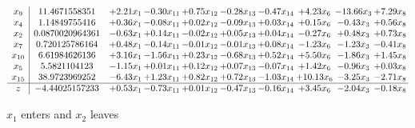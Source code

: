 \documentclass[9pt]{article}
\begin{document}
 \[\begin{array}{c| c c@{\hskip 2pt} c@{\hskip 2pt} c@{\hskip 2pt} c@{\hskip 2pt} c@{\hskip 2pt} c@{\hskip 2pt} c@{\hskip 2pt} c@{\hskip 2pt} }
 x_{9}   &  11.4671558351 & +  2.21 x_{1} & -0.30 x_{11} & +  0.75 x_{12} & -0.28 x_{13} & -0.47 x_{14} & +  4.23 x_{6} & -13.66 x_{3} & +  7.29 x_{8}\\
 x_{4}   &  1.14849755416 & +  0.36 x_{1} & -0.08 x_{11} & +  0.02 x_{12} & -0.09 x_{13} & +  0.03 x_{14} & +  0.15 x_{6} & -0.43 x_{3} & +  0.56 x_{8}\\
 x_{2}   &  0.0870020964361 & -0.63 x_{1} & +  0.14 x_{11} & -0.02 x_{12} & +  0.05 x_{13} & +  0.04 x_{14} & -0.27 x_{6} & +  0.48 x_{3} & +  0.73 x_{8}\\
 x_{7}   &  0.720125786164 & +  0.48 x_{1} & -0.14 x_{11} & -0.01 x_{12} & -0.01 x_{13} & +  0.08 x_{14} & -1.23 x_{6} & -1.23 x_{3} & -0.41 x_{8}\\
 x_{10}   &  6.61984626136 & +  3.16 x_{1} & -1.56 x_{11} & +  0.23 x_{12} & -0.68 x_{13} & +  0.52 x_{14} & +  5.50 x_{6} & -1.86 x_{3} & +  1.45 x_{8}\\
 x_{5}   &  5.5821104123 & -1.15 x_{1} & +  0.01 x_{11} & +  0.12 x_{12} & +  0.07 x_{13} & -0.07 x_{14} & +  1.42 x_{6} & -0.96 x_{3} & +  0.03 x_{8}\\
 x_{15}   &  38.9723969252 & -6.43 x_{1} & +  1.23 x_{11} & +  0.82 x_{12} & +  0.72 x_{13} & -1.03 x_{14} & + 10.13 x_{6} & -3.25 x_{3} & -2.71 x_{8}\\
\hline
z    &  -4.44025157233 & +  0.53 x_{1} & -0.73 x_{11} & +  0.01 x_{12} & -0.47 x_{13} & -0.16 x_{14} & +  3.45 x_{6} & -2.04 x_{3} & -0.18 x_{8}\\
\end{array}\]


 $ x_{1} $ enters and $ x_{2} $ leaves 
\end{document}
